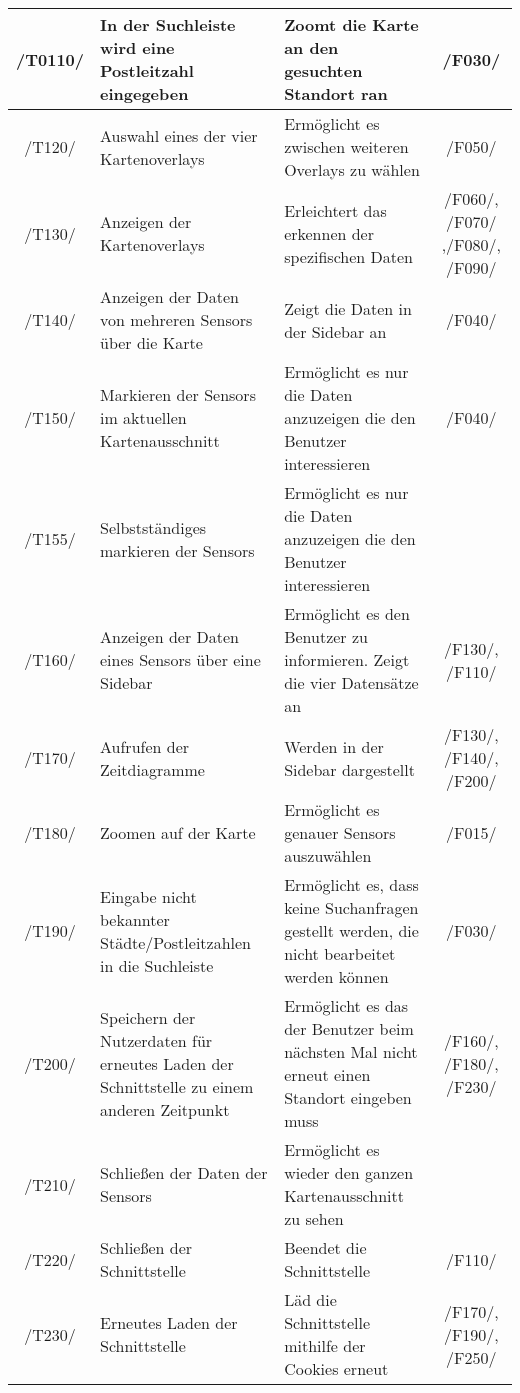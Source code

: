 \begin{tabularx}{\textwidth}{| c | X | X | c |}
    \hline
    /T0110/ & In der Suchleiste wird eine Postleitzahl eingegeben & Zoomt die Karte an den gesuchten Standort ran &  /F030/ \\
    \hline
    /T120/ & Auswahl eines der vier \glspl{Kartenoverlay} & Ermöglicht es zwischen weiteren Overlays zu wählen & /F050/ \\
    \hline
    /T130/ & Anzeigen der \glspl{Kartenoverlay} & Erleichtert das erkennen der spezifischen Daten & /F060/, /F070/ ,/F080/, /F090/ \\
    \hline
    /T140/ & Anzeigen der Daten von mehreren \glspl{Sensor} über die Karte & Zeigt die Daten in der Sidebar an & /F040/ \\
    \hline
    /T150/ & Markieren der \glspl{Sensor} im aktuellen Kartenausschnitt & Ermöglicht es nur die Daten anzuzeigen die den Benutzer interessieren & /F040/ \\
    \hline 
    /T155/ & Selbstständiges markieren der \glspl{Sensor} & Ermöglicht es nur die Daten anzuzeigen die den Benutzer interessieren & \\
    \hline
    /T160/ & Anzeigen der Daten eines Sensors über eine \gls{Sidebar} & Ermöglicht es den Benutzer zu informieren. Zeigt die vier Datensätze an &  /F130/, /F110/ \\
    \hline
    /T170/ & Aufrufen der Zeitdiagramme & Werden in der \gls{Sidebar} dargestellt & /F130/, /F140/, /F200/ \\
    \hline
    /T180/ & Zoomen auf der Karte & Ermöglicht es genauer \glspl{Sensor} auszuwählen & /F015/ \\
    \hline
    /T190/ & Eingabe nicht bekannter Städte/Postleitzahlen in die Suchleiste & Ermöglicht es, dass keine Suchanfragen gestellt werden, die nicht bearbeitet werden können & /F030/ \\
    \hline
    /T200/ & Speichern der Nutzerdaten für erneutes Laden der Schnittstelle zu einem anderen Zeitpunkt & Ermöglicht es das der Benutzer beim nächsten Mal nicht erneut einen Standort eingeben muss & /F160/, /F180/, /F230/ \\
    \hline
    /T210/ & Schließen der Daten der \glspl{Sensor} & Ermöglicht es wieder den ganzen Kartenausschnitt zu sehen & \\
    \hline
    /T220/ & Schließen der Schnittstelle & Beendet die Schnittstelle & /F110/ \\
    \hline
    /T230/ & Erneutes Laden der Schnittstelle & Läd die Schnittstelle mithilfe der Cookies erneut & /F170/, /F190/, /F250/ \\
    \hline
\end{tabularx}

